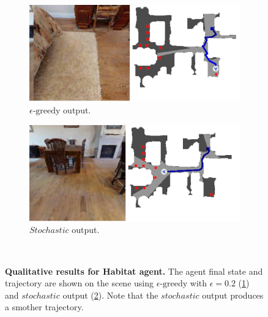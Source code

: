 \begin{figure}
    \centering
    \begin{subfigure}[b]{0.49\textwidth}
        \centering
        \includegraphics[width=\textwidth]{figures/understanding_vsn/qualitative_results/habitat_epsilon}
        \caption{$\epsilon\text{-greedy}$ output.}
        \label{fig:habitat_qualitative_epsilon}
    \end{subfigure}
    \hfill
    \begin{subfigure}[b]{0.49\textwidth}
        \centering
        \includegraphics[width=\textwidth]{figures/understanding_vsn/qualitative_results/habitat_stochastic}
        \caption{$Stochastic$ output.}
        \label{fig:habitat_qualitative_stochastic}
    \end{subfigure}~\caption{\textbf{Qualitative results for Habitat agent.} The agent final state and trajectory are shown on the scene using $\epsilon\text{-greedy}$ with $\epsilon = 0.2$ (\ref{fig:habitat_qualitative_epsilon}) and $stochastic$ output (\ref{fig:habitat_qualitative_stochastic}). Note that the $stochastic$ output produces a smother trajectory.}
    \label{fig:habitat_qualitative}
\end{figure}


